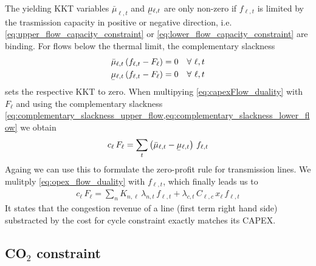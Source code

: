 \documentclass[11pt,twocolumn]{article}
\newcommand{\ubar}[1]{\underaccent{\bar}{#1}}
\newcommand{\Forall}[1]{\hspace{10pt} \forall \,\, #1 }
\newcommand{\capacityFlow}{F_{\ell}}
\newcommand{\capexFlow}{c_{\ell}}
\newcommand{\incidence}[1][n]{K_{#1,\ell}}
\newcommand{\mulowerflow}{\ubar{\mu}_{\ell,t}}
\newcommand{\muupperflow}{\bar{\mu}_{\ell,t}}
\newcommand{\lmp}[1][n]{\lambda_{#1,t}}
\newcommand{\flow}{f_{\ell,t}}
\newcommand{\cycle}{C_{\ell,c}}
\newcommand{\impedance}{x_\ell}
\newcommand{\cycleprice}{\lambda_{c,t}}
\begin{document}
The yielding KKT variables $\muupperflow$ and $\mulowerflow$ are only non-zero if $\flow$ is limited by the trasmission capacity in positive or negative direction, i.e. \cref{eq:upper_flow_capacity_constraint} or \cref{eq:lower_flow_capacity_constraint} are binding. For flows below the thermal limit, the complementary slackness 
\begin{align}
\muupperflow \left( \flow - \capacityFlow \right)  &= 0 \Forall{\ell,t}
\label{eq:complementary_slackness_upper_flow} \\
\mulowerflow \left( \flow - \capacityFlow \right) &=  0 \Forall{\ell,t}
\label{eq:complementary_slackness_lower_flow} 
\end{align}
sets the respective KKT to zero. 
When multipying \cref{eq:capexFlow_duality} with $\capacityFlow$ and using the complementary slackness \cref{eq:complementary_slackness_upper_flow,eq:complementary_slackness_lower_flow} we obtain 
\begin{align}
 \capexFlow \, \capacityFlow = \sum_t \left( \muupperflow - \mulowerflow \right)  \, \flow
 \label{eq:capital_price_flow_sum}
\end{align}
Againg we can use this to formulate the zero-profit rule for transmission lines. We mulitply \cref{eq:opex_flow_duality} with $\flow$, which finally leads us to 
\begin{align}
\capexFlow \, \capacityFlow = \sum_n \incidence\, \lmp\, \flow + \cycleprice\, \cycle\, \impedance\, \flow 
\end{align}
It states that the congestion revenue of a line (first term right hand side) substracted by the cost for cycle constraint exactly matches its CAPEX. 





\subsection{CO$_2$ constraint}
\end{document}
